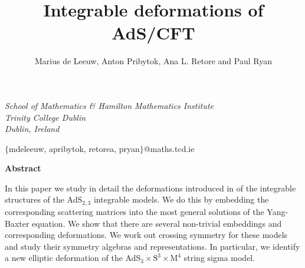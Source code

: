 \documentclass[12pt,a4paper]{article}
\title{Integrable deformations of AdS/CFT}
\author{ Marius de Leeuw, Anton Pribytok, Ana L. Retore and Paul Ryan}
\makeatletter
\numberwithin{equation}{section}
\providecommand{\href}[2]{#2}
\newcommand{\arxivlink}[1]{\href{http://arxiv.org/abs/#1}{arxiv:#1}}
\def\thetitle{\@title}
\def\theauthor{\@author}
\makeatother
\begin{document}
\thispagestyle{empty}


\vspace*{2cm}
\begin{center}%
\begingroup\Large\bfseries\thetitle\par\endgroup
\vspace{1cm}

\begingroup\scshape\theauthor\par\endgroup
\vspace{5mm}%


\begingroup\itshape
School of Mathematics
\& Hamilton Mathematics Institute\\
Trinity College Dublin\\
Dublin, Ireland
\par\endgroup
\vspace{5mm}


\begingroup\ttfamily
$\{$mdeleeuw,
apribytok,
retorea,
pryan$\}$@maths.tcd.ie
\par\endgroup


\vfill

\textbf{Abstract}\vspace{5mm}

\begin{minipage}{12.7cm}
In this paper we study in detail the deformations introduced in \cite{deLeeuw:2020ahe} of the integrable structures of the AdS${}_{2,3}$ integrable models. We do this by embedding the corresponding scattering matrices into the most general solutions of the Yang-Baxter equation. We show that there are several non-trivial embeddings and corresponding deformations. 
We work out crossing symmetry for these models and study their symmetry algebras and representations. In particular, we identify a new elliptic deformation of the AdS$_3\times\mathrm{S}^3\times\mathrm{M}^4$ string sigma model. 
\end{minipage}

\vspace*{4cm}

\end{center}

\newpage



\end{document}
